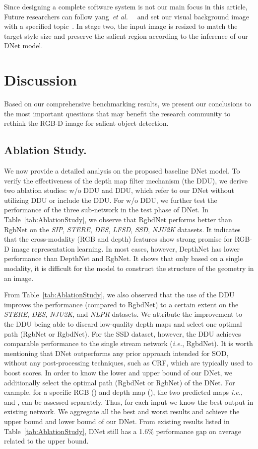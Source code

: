 \documentclass[journal]{IEEEtran}
\def\ie{\emph{i.e.}}
\def\etal{{\em et al.~}}
\newcommand{\tabref}[1]{Table~\ref{#1}}
\newcommand{\fdp}[1]{#1}
\begin{document}
\fdp{Since designing a complete software system is not our main focus in this article,}
Future researchers can \fdp{follow} yang~\etal~\cite{yang2016automatic} \fdp{and} set our visual background
image with a specified topic~\cite{jahanian2013recommendation}.
In stage two, the input image \fdp{is} resized
to \fdp{match} the target style size and preserve the salient region according
to \fdp{the} inference of our DNet model.


\section{Discussion}\label{sec:discussion}

Based on our comprehensive benchmarking results, we present our
conclusions to the most important questions that may benefit the
research community to rethink the RGB-D image for salient object detection.

\subsection{Ablation Study.}\label{sec:ablationStudy}
\fdp{We now provide a detailed analysis on the proposed baseline DNet model.
To verify the effectiveness of the depth map filter mechanism (the DDU),
we derive two ablation studies: w/o DDU and DDU, which refer to our DNet without utilizing DDU or include the DDU. For w/o DDU, we further test the performance of the three sub-network in the test phase of DNet.
In \tabref{tab:AblationStudy}, we observe that RgbdNet performs better than RgbNet on the \emph{SIP},
\emph{STERE}, \emph{DES}, \emph{LFSD}, \emph{SSD}, \emph{NJU2K} datasets. It indicates that the
cross-modality (RGB and depth) features show strong promise for RGB-D image representation learning.
In most cases, however, DepthNet has lower performance than DepthNet and RgbNet.  It shows that only based on a single modality, it is difficult for the model to construct the structure of the geometry in an image.}


From \tabref{tab:AblationStudy}, we also observed that the use of the
DDU improves \fdp{the} performance (compared to RgbdNet) to a certain extent on the \emph{STERE}, \emph{DES}, \emph{NJU2K}, and \emph{NLPR} datasets.
We attribute the improvement to the DDU being able to discard low-quality depth maps and select one optimal path (RgbNet or RgbdNet).
For the SSD dataset, however, the DDU achieves comparable performance to the single stream network (\ie, RgbdNet).
It is worth mentioning that DNet outperforms any prior approach intended for SOD, without any post-processing techniques, such as CRF, which are typically used to boost scores. In order to know the lower and upper bound of our DNet, we additionally select the optimal path (RgbdNet or RgbNet) of the DNet. For example, for a specific RGB () and depth map (), the two predicted maps \ie,  and , can be assessed separately. Thus, for each input we know the best output in existing network. We aggregate all the best and worst results and achieve the upper bound and lower bound of our DNet. From existing results listed in \tabref{tab:AblationStudy}, DNet still has a 1.6\% performance gap on average related to the upper bound.
\end{document}
